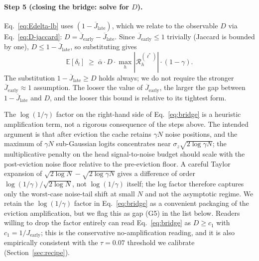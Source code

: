 \documentclass{article}
\begin{document}
\paragraph{Step 5 (closing the bridge: solve for $D$).}
Eq.~\eqref{eq:Edelta-lb} uses $(1 - \overline{J}_{\text{late}})$, which we
relate to the observable $D$ via Eq.~\eqref{eq:D-jaccard}: $D =
\overline{J}_{\text{early}} - \overline{J}_{\text{late}}$. Since
$\overline{J}_{\text{early}} \leq 1$ trivially (Jaccard is bounded by
one), $D \leq 1 - \overline{J}_{\text{late}}$, so substituting gives
\begin{equation}
\label{eq:final-lb}
\mathbb{E}[\delta_t]
\;\geq\;
\bar\alpha \cdot D \cdot \max_h |\mathcal{R}^{(\ell^*)}_h|
\cdot (1 - \gamma).
\end{equation}
The substitution $1 - \overline{J}_{\text{late}} \geq D$ holds always; we
do not require the stronger $\overline{J}_{\text{early}} \approx 1$
assumption. The looser the value of $\overline{J}_{\text{early}}$, the
larger the gap between $1 - \overline{J}_{\text{late}}$ and $D$, and the
looser this bound is relative to its tightest form.

The $\log(1/\gamma)$ factor on the right-hand side of
Eq.~\eqref{eq:bridge} is a heuristic amplification term, not a rigorous
consequence of the steps above. The intended argument is that after
eviction the cache retains $\gamma N$ noise positions, and the maximum of
$\gamma N$ sub-Gaussian logits concentrates near $\sigma_z \sqrt{2 \log
\gamma N}$; the multiplicative penalty on the head signal-to-noise budget
should scale with the post-eviction noise floor relative to the
pre-eviction floor. A careful Taylor expansion of $\sqrt{2 \log N} -
\sqrt{2 \log \gamma N}$ gives a difference of order $\log(1/\gamma) /
\sqrt{2 \log N}$, not $\log(1/\gamma)$ itself; the log factor therefore
captures only the worst-case noise-tail shift at small $N$ and not the
asymptotic regime. We retain the $\log(1/\gamma)$ factor in
Eq.~\eqref{eq:bridge} as a convenient packaging of the eviction
amplification, but we flag this as gap (G5) in the list below. Readers
willing to drop the factor entirely can read Eq.~\eqref{eq:bridge} as $D
\geq c_1$ with $c_1 = 1/J_{\text{early}}$; this is the conservative
no-amplification reading, and it is also empirically consistent with the
$\tau = 0.07$ threshold we calibrate (Section~\ref{sec:recipe}).
\end{document}
